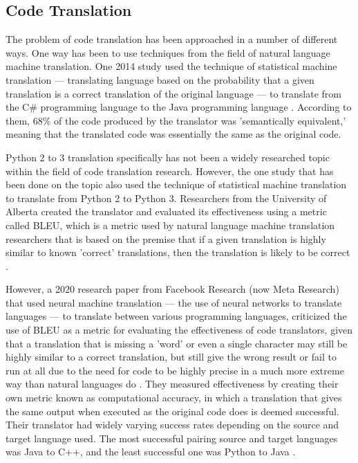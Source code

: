 \subsection{Code Translation}
The problem of code translation has been approached in a number of different ways. One way has been to use techniques from the field of natural language machine translation. One 2014 study used the technique of statistical machine translation --- translating language based on the probability that a given translation is a correct translation of the original language --- to translate from the C\# programming language to the Java programming language \autocite{Karaivanov}. According to them, 68\% of the code produced by the translator was 'semantically equivalent,' meaning that the translated code was essentially the same as the original code.

Python 2 to 3 translation specifically has not been a widely researched topic within the field of code translation research. However, the one study that has been done on the topic also used the technique of statistical machine translation to translate from Python 2 to Python 3. Researchers from the University of Alberta created the translator and evaluated its effectiveness using a metric called BLEU, which is a metric used by natural language machine translation researchers that is based on the premise that if a given translation is highly similar to known 'correct' translations, then the translation is likely to be correct \autocite{Aggarwal}.

However, a 2020 research paper from Facebook Research (now Meta Research) that used neural machine translation --- the use of neural networks to translate languages --- to translate between various programming languages, criticized the use of BLEU as a metric for evaluating the effectiveness of code translators, given that a translation that is missing a 'word' or even a single character may still be highly similar to a correct translation, but still give the wrong result or fail to run at all due to the need for code to be highly precise in a much more extreme way than natural languages do \autocite{Roziere}. They measured effectiveness by creating their own metric known as computational accuracy, in which a translation that gives the same output when executed as the original code does is deemed successful. Their translator had widely varying success rates depending on the source and target language used. The most successful pairing source and target languages was Java to C++, and the least successful one was Python to Java \autocite{Roziere}.

